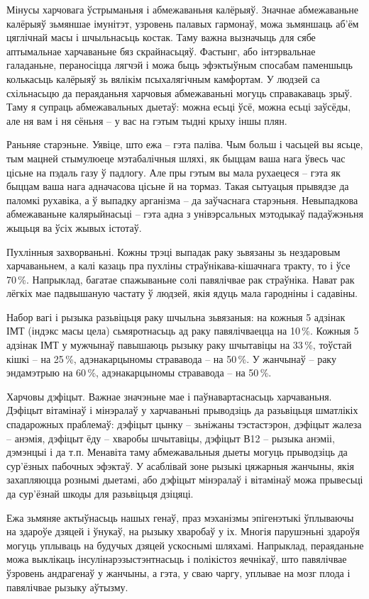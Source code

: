 Мінусы харчовага ўстрыманьня і абмежаваньня калёрыяў. Значнае абмежаваньне калёрыяў зьмяншае імунітэт, узровень палавых гармонаў, можа зьмяншаць аб'ём цяглічнай масы і шчыльнасьць костак. Таму важна вызначыць для сябе аптымальнае харчаваньне бяз скрайнасьцяў. Фастынг, або інтэрвальнае галаданьне, пераносіцца лягчэй і можа быць эфэктыўным спосабам паменшыць колькасьць калёрыяў зь вялікім псыхалягічным камфортам. У людзей са схільнасьцю да пераяданьня харчовыя абмежаваньні могуць справакаваць зрыў. Таму я супраць абмежавальных дыетаў: можна есьці ўсё, можна есьці заўсёды, але ня вам і ня сёньня – у вас на гэтым тыдні крыху іншы плян.

Раньняе старэньне. Уявіце, што ежа – гэта паліва. Чым больш і часьцей вы ясьце, тым мацней стымулюеце мэтабалічныя шляхі, як быццам ваша нага ўвесь час цісьне на пэдаль газу ў падлогу. Але пры гэтым вы мала рухаецеся – гэта як быццам ваша нага адначасова цісьне й на тормаз. Такая сытуацыя прывядзе да паломкі рухавіка, а ў выпадку арганізма – да заўчаснага старэньня. Невыпадкова абмежаваньне калярыйнасьці – гэта адна з унівэрсальных мэтодыкаў падаўжэньня жыцьця ва ўсіх жывых істотаў.

Пухлінныя захворваньні. Кожны трэці выпадак раку зьвязаны зь нездаровым харчаваньнем, а калі казаць пра пухліны страўнікава-кішачнага тракту, то і ўсе 70\,\%. Напрыклад, багатае спажываньне солі павялічвае рак страўніка. Нават рак лёгкіх мае падвышаную частату ў людзей, якія ядуць мала гародніны і садавіны.

Набор вагі і рызыка разьвіцьця раку шчыльна зьвязаныя: на кожныя 5 адзінак ІМТ (індэкс масы цела) сьмяротнасьць ад раку павялічваецца на 10\,\%. Кожныя 5 адзінак ІМТ у мужчынаў павышаюць рызыку раку шчытавіцы на 33\,\%, тоўстай кішкі – на 25\,\%, адэнакарцыномы стрававода – на 50\,\%. У жанчынаў – раку эндамэтрыю на 60\,\%, адэнакарцыномы стрававода – на 50\,\%.

Харчовы дэфіцыт. Важнае значэньне мае і паўнавартаснасьць харчаваньня. Дэфіцыт вітамінаў і мінэралаў у харчаваньні прыводзіць да разьвіцьця шматлікіх спадарожных праблемаў: дэфіцыт цынку – зьніжаны тэстастэрон, дэфіцыт жалеза – анэмія, дэфіцыт ёду – хваробы шчытавіцы, дэфіцыт В12 – рызыка анэміі, дэмэнцыі і да т.п. Менавіта таму абмежавальныя дыеты могуць прыводзіць да сур'ёзных пабочных эфэктаў. У асаблівай зоне рызыкі цяжарныя жанчыны, якія захапляюцца рознымі дыетамі, або дэфіцыт мінэралаў і вітамінаў можа прывесьці да сур'ёзнай шкоды для разьвіцьця дзіцяці.

Ежа зьмяняе актыўнасьць нашых генаў, праз мэханізмы эпігенэтыкі ўплываючы на здароўе дзяцей і ўнукаў, на рызыку хваробаў у іх. Многія парушэньні здароўя могуць уплываць на будучых дзяцей ускоснымі шляхамі. Напрыклад, пераяданьне можа выклікаць інсулінарэзыстэнтнасьць і полікістоз яечнікаў, што павялічвае ўзровень андрагенаў у жанчыны, а гэта, у сваю чаргу, уплывае на мозг плода і павялічвае рызыку аўтызму.

